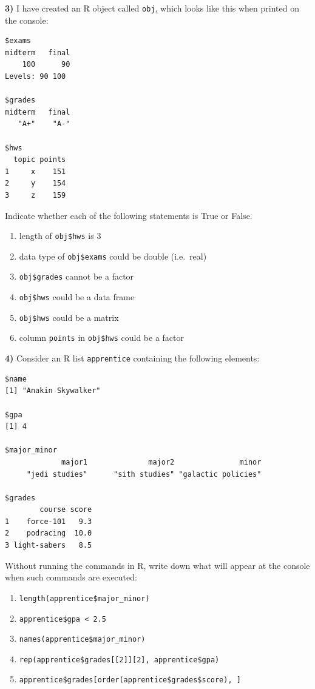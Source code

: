 \documentclass[
]{book}
\begin{document}
\textbf{3)} I have created an R object called \texttt{obj}, which looks like this when
printed on the console:

\begin{verbatim}
$exams
midterm   final 
    100      90 
Levels: 90 100

$grades
midterm   final 
   "A+"    "A-" 

$hws
  topic points
1     x    151
2     y    154
3     z    159
\end{verbatim}

Indicate whether each of the following statements is True or False.

\begin{enumerate}
\def\labelenumi{\alph{enumi})}
\item
  length of \texttt{obj\$hws} is 3
\item
  data type of \texttt{obj\$exams} could be double (i.e.~real)
\item
  \texttt{obj\$grades} cannot be a factor
\item
  \texttt{obj\$hws} could be a data frame
\item
  \texttt{obj\$hws} could be a matrix
\item
  column \texttt{points} in \texttt{obj\$hws} could be a factor
\end{enumerate}

\textbf{4)} Consider an R list \texttt{apprentice} containing the following elements:

\begin{verbatim}
$name
[1] "Anakin Skywalker"

$gpa
[1] 4

$major_minor
             major1              major2               minor 
     "jedi studies"      "sith studies" "galactic policies" 

$grades
        course score
1    force-101   9.3
2    podracing  10.0
3 light-sabers   8.5
\end{verbatim}

Without running the commands in R, write down what will appear at the console
when such commands are executed:

\begin{enumerate}
\def\labelenumi{\alph{enumi})}
\item
  \texttt{length(apprentice\$major\_minor)}
\item
  \texttt{apprentice\$gpa\ \textless{}\ 2.5}
\item
  \texttt{names(apprentice\$major\_minor)}
\item
  \texttt{rep(apprentice\$grades{[}{[}2{]}{]}{[}2{]},\ apprentice\$gpa)}
\item
  \texttt{apprentice\$grades{[}order(apprentice\$grades\$score),\ {]}}
\end{enumerate}
\end{document}
